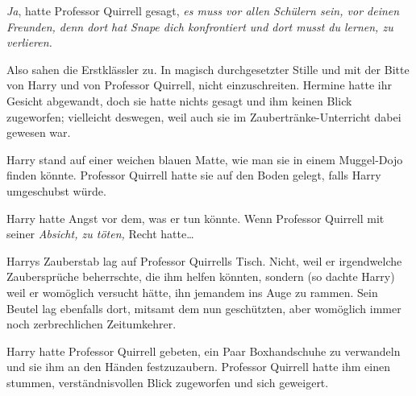 \later

\emph{Ja}, hatte Professor Quirrell gesagt, \emph{es muss vor allen Schülern sein, vor deinen Freunden, denn dort hat Snape dich konfrontiert und dort musst du lernen, zu verlieren.}

Also sahen die Erstklässler zu. In magisch durchgesetzter Stille und mit der Bitte von Harry und von Professor Quirrell, nicht einzuschreiten. Hermine hatte ihr Gesicht abgewandt, doch sie hatte nichts gesagt und ihm keinen Blick zugeworfen; vielleicht deswegen, weil auch sie im Zaubertränke-Unterricht dabei gewesen war.

Harry stand auf einer weichen blauen Matte, wie man sie in einem Muggel-Dojo finden könnte. Professor Quirrell hatte sie auf den Boden gelegt, falls Harry umgeschubst würde.

Harry hatte Angst vor dem, was er tun könnte. Wenn Professor Quirrell mit seiner \emph{Absicht, zu töten,} Recht hatte…

Harrys Zauberstab lag auf Professor Quirrells Tisch. Nicht, weil er irgendwelche Zaubersprüche beherrschte, die ihm helfen könnten, sondern (so dachte Harry) weil er womöglich versucht hätte, ihn jemandem ins Auge zu rammen. Sein Beutel lag ebenfalls dort, mitsamt dem nun geschützten, aber womöglich immer noch zerbrechlichen Zeitumkehrer.

Harry hatte Professor Quirrell gebeten, ein Paar Boxhandschuhe zu verwandeln und sie ihm an den Händen festzuzaubern. Professor Quirrell hatte ihm einen stummen, verständnisvollen Blick zugeworfen und sich geweigert.

